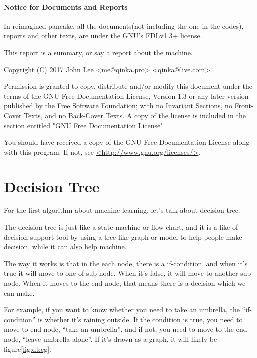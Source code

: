 \documentclass{article}
\begin{document}
\paragraph{Notice for Documents and Reports}

In reimagined-pancake, all the documents(not including the one in the codes), reports and other texts,
are under the GNU's FDLv1.3+ license.

This report is a summary, or say a report about the machine.

Copyright (C)  2017 John Lee <me@qinka.pro> <qinka@live.com>

Permission is granted to copy, distribute and/or modify this document
under the terms of the GNU Free Documentation License, Version 1.3
or any later version published by the Free Software Foundation;
with no Invariant Sections, no Front-Cover Texts, and no Back-Cover Texts.
A copy of the license is included in the section entitled "GNU
Free Documentation License".

You should have received a copy of the GNU Free Documentation License
along with this program.  If not, see \href{http://www.gnu.org/licenses}{<http://www.gnu.org/licenses/>}.

\section{Decision Tree}
\label{sec:decisiontree}

For the first algorithm about machine learning, let's talk about decision tree.

The decision tree is just like a state machine or flow chart, and it is a like of decision support tool
by using a tree-like graph or model to help people make decision, while it can also help machine.

The way it works is that in the each node, there is a if-condition, and when it's true it will move to
one of sub-node. When it's false, it will move to another sub-node. When it moves to the end-node,
that means there is a decision which we can make.

For example, if you want to know whether you need to take an umbrella, the ``if-condition'' is
whether it's raining outside. If the condition is true, you need to move to end-node, ``take an umbrella'',
and if not, you need to move to the end-node, ``leave umbrella alone''.
If it's drawn as a graph, it will likely be figure\ref{fig:dt:eg}.
\end{document}
